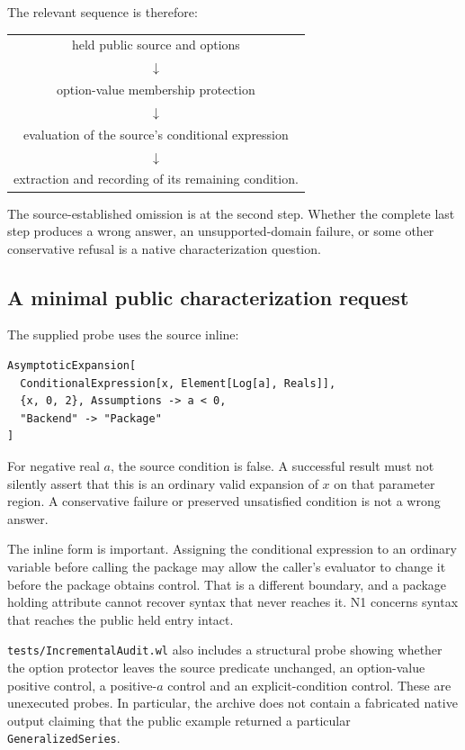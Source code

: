 \documentclass[11pt,a4paper]{article}
\newcommand{\code}[1]{\nolinkurl{#1}}
\begin{document}
The relevant sequence is therefore:
\begin{center}
\begin{tabular}{c}
held public source and options\\
$\downarrow$\\
option-value membership protection\\
$\downarrow$\\
evaluation of the source's conditional expression\\
$\downarrow$\\
extraction and recording of its remaining condition.
\end{tabular}
\end{center}
The source-established omission is at the second step. Whether the complete last step produces a wrong answer, an unsupported-domain failure, or some other conservative refusal is a native characterization question.

\subsection{A minimal public characterization request}
The supplied probe uses the source inline:
\begin{lstlisting}
AsymptoticExpansion[
  ConditionalExpression[x, Element[Log[a], Reals]],
  {x, 0, 2}, Assumptions -> a < 0,
  "Backend" -> "Package"
]
\end{lstlisting}
For negative real $a$, the source condition is false. A successful result must not silently assert that this is an ordinary valid expansion of $x$ on that parameter region. A conservative failure or preserved unsatisfied condition is not a wrong answer.

The inline form is important. Assigning the conditional expression to an ordinary variable before calling the package may allow the caller's evaluator to change it before the package obtains control. That is a different boundary, and a package holding attribute cannot recover syntax that never reaches it. N1 concerns syntax that reaches the public held entry intact.

\code{tests/IncrementalAudit.wl} also includes a structural probe showing whether the option protector leaves the source predicate unchanged, an option-value positive control, a positive-$a$ control and an explicit-condition control. These are unexecuted probes. In particular, the archive does not contain a fabricated native output claiming that the public example returned a particular \code{GeneralizedSeries}.
\end{document}
